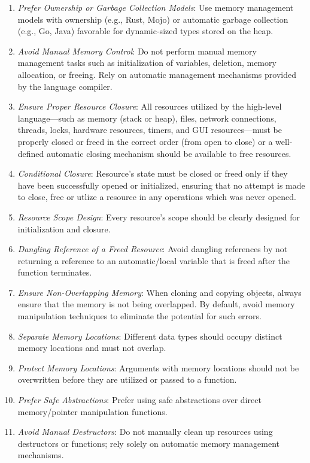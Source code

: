 \documentclass[9pt]{IEEEtran} %
\begin{document}
\begin{enumerate}
  \item \textit{Prefer Ownership or Garbage Collection Models}: Use memory management models with ownership (e.g., Rust, Mojo) or automatic garbage collection (e.g., Go, Java) favorable for dynamic-sized types stored on the heap.
  \item \textit{Avoid Manual Memory Control}: Do not perform manual memory management tasks such as initialization of variables, deletion, memory allocation, or freeing. Rely on automatic management mechanisms provided by the language compiler.
  \item \textit{Ensure Proper Resource Closure}: All resources utilized by the high-level language—such as memory (stack or heap), files, network connections, threads, locks, hardware resources, timers, and GUI resources—must be properly closed or freed in the correct order (from open to close) or a well-defined automatic closing mechanism should be available to free resources.
  \item \textit{Conditional Closure}: Resource’s state must be closed or freed only if they have been successfully opened or initialized, ensuring that no attempt is made to close, free or utlize a resource in any operations which was never opened.
  \item \textit{Resource Scope Design}: Every resource’s scope should be clearly designed for initialization and closure.
  \item \textit{Dangling Reference of a Freed Resource}: Avoid dangling references by not returning a reference to an automatic/local variable that is freed after the function terminates.
  \item \textit{Ensure Non-Overlapping Memory}: When cloning and copying objects, always ensure that the memory is not being overlapped. By default, avoid memory manipulation techniques to eliminate the potential for such errors.
  \item \textit{Separate Memory Locations}: Different data types should occupy distinct memory locations and must not overlap. 
  \item \textit{Protect Memory Locations}: Arguments with memory locations should not be overwritten before they are utilized or passed to a function.
  \item \textit{Prefer Safe Abstractions}: Prefer using safe abstractions over direct memory/pointer manipulation functions.
  \item \textit{Avoid Manual Destructors}: Do not manually clean up resources using destructors or functions; rely solely on automatic memory management mechanisms. 

\end{enumerate}
\end{document}
